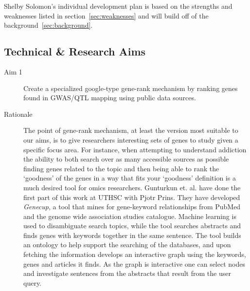 Shelby Solomon's individual development plan is based on the strengths and weaknesses listed in section~\ref{sec:weaknesses} and will build off of the background~\ref{sec:background}.

\subsection{Technical \& Research Aims}
\begin{description}
	\item[Aim 1] Create a specialized google-type gene-rank mechanism by ranking genes found in GWAS/QTL mapping using public data sources. 
	\item[Rationale] The point of gene-rank mechanism, at least the version most suitable to our aims, is to give researchers interesting sets of genes to study given a specific focus area.
For instance, when attempting to understand addiction the ability to both search over as many accessible sources as possible finding genes related to the topic and then being able to rank the `goodness' of the genes in a way that fits your `goodness' definition is a much desired tool for omics researchers.
Gunturkun\cite{Gunturkun:2022} et. al. have done the first part of this work at UTHSC with Pjotr Prins. 
They have developed \textit{Genecup}, a tool that mines for gene-keyword relationships from PubMed and the genome wide association studies catalogue\cite{Buniello:2019}.
Machine learning is used to disambiguate search topics, while the tool searches abstracts and finds genes with keywords together in the same sentence.
The tool builds an ontology to help support the searching of the databases, and upon fetching the information develops an interactive graph using the keywords, genes and articles it finds.
As the graph is interactive one can select nodes and investigate sentences from the abstracts that result from the user query.


\end{description}
